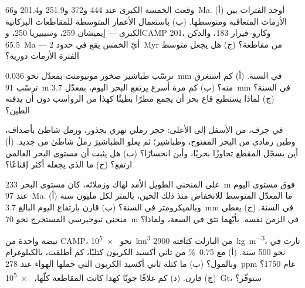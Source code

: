 \begin{exercise}[$\star$]\label{exo:b2:phanerozoic-earth:2}
وقعت الخمسة الكبرى عند 444 و372 و251.9 و201.4 و\qty{66}{Ma}. (أ) أوجد الفترات بين
الأزمات المتعاقبة ومتوسطها. (ب) باستعمال الأعمار المتوسطة للمقاطعات البركانية الكبرى ---
إيميشان 259، وسيبيريا 250، وCAMP 201، وكارو--فيرار 183، والدكن \qty{65.5}{Ma} --- أيّ
الخمس يقع في حدود \qty{2}{Myr} من مقاطعة؟ (ج) هل يجعل متوسط الفترة الأزمات دورية؟
\end{exercise}

\begin{exercise}[$\star$]\label{exo:b2:phanerozoic-earth:3}
ترسّب طباشير صخور مونيومنت بمعدّل نحو \qty{0.036}{mm} في السنة. (أ) كم استغرق ترسّب
\qty{91}{m} منه؟ (ب) كم مرة أسرع يرتفع البحر اليوم، بمعدّل \qty{3.7}{mm} في
السنة؟ (ج) لماذا يستطيع قاع بحر أن يجمع مطرًا بطيئًا كهذا من الرواسب دون أن يدفنه الطين؟
\end{exercise}

\begin{exercise}[$\star$]\label{exo:b2:phanerozoic-earth:4}
في جرف، من الأسفل إلى الأعلى: حجر رملي نهري بجذور، ورمل شاطئ بأصداف، وطين رمادي من البحر
المفتوح، وطباشير؛ ثم يعلو الطباشيرَ رملُ شاطئ من جديد. (أ) أين يسجّل المقطع
تجاوزًا بحريًا، وأين انحسارًا؟ (ب) هل يثبت  أن مستوى البحر العالمي
ارتفع؟ (ج) ما الذي يجعله أكثر إقناعًا؟
\end{exercise}

\begin{exercise}[$\star\star$]\label{exo:b2:phanerozoic-earth:5}
على المنحنى الطويل الأمد لهاك وزملائه، كان مستوى البحر \qty{233}{m} فوق مستوى اليوم عند
\qty{97}{Ma}. (أ) ما المعدّل المتوسط للانخفاض منذ ذلك الحين، بالمتر لكل مليون سنة وبالميكرومتر
في السنة؟ (ب) قارن بارتفاع اليوم البالغ \qty{3.7}{mm} في السنة. (ج) يعطي منحنى نيوجيرسي
المستخرج  نحو \qty{70}{m} في الزمن نفسه. بأيّهما تثق في
السعة، ولماذا؟
\end{exercise}

\begin{exercise}[$\star\star$]\label{exo:b2:phanerozoic-earth:6}
نبضة واحدة من CAMP، نحو \qty{e5}{km^3} من البازلت كثافته \qty{2900}{kg.m^{-3}}،
ثارت في نحو 500 سنة. (أ) مع \qty{0.75}{\percent} من ثاني أكسيد الكربون كتليًا، كم
أطلقت، بالكيلوغرام وبالمول؟ (ب) ما كتلة ثاني أكسيد الكربون التي حملها الهواء عند
\qty{278}{ppm} عام 1750؟ (ج) قارن. (د) كم غلافًا جويًا كهذا كانت المقاطعة كلّها،
\qty{e5}{Gt}، ستوفّر؟
\end{exercise}

